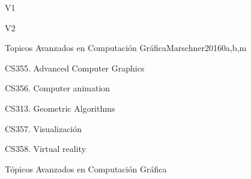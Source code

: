\begin{syllabus}
\begin{competences}{V1}
    \item {}
    \item {}
\end{competences}

\begin{competences}{V2}
    \item {}
    \item {}
\end{competences}

\begin{unit}{Topicos Avanzados en Computación Gráfica}{}{Marschner2016}{0}{a,b,m}
   \begin{topics}
      \item CS355. Advanced Computer Graphics
      \item CS356. Computer animation
      \item CS313. Geometric Algorithms
      \item CS357. Visualización
      \item CS358. Virtual reality
   \end{topics}

   \begin{learningoutcomes}
      \item Tópicos Avanzados en Computación Gráfica
   \end{learningoutcomes}
\end{unit}

\begin{coursebibliography}
\end{coursebibliography}

\end{syllabus}
